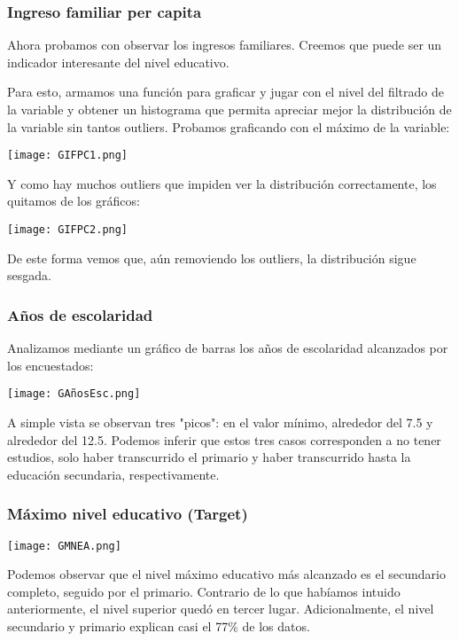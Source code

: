 \documentclass[a4paper]{article}
\begin{document}
        \subsubsection{Ingreso familiar per capita}
        
            Ahora probamos con observar los ingresos familiares. Creemos que puede ser un indicador interesante del nivel educativo.
        
            Para esto, armamos una función para graficar y jugar con el nivel del filtrado de la variable y obtener un histograma que permita apreciar mejor la distribución de la variable sin tantos outliers. Probamos graficando con el máximo de la variable:
        
            \texttt{[image: GIFPC1.png]}
        
            Y como hay muchos outliers que impiden ver la distribución correctamente, los quitamos de los gráficos:
        
            \texttt{[image: GIFPC2.png]}

            De este forma vemos que, aún removiendo los outliers, la distribución sigue sesgada.

        \newpage    

        \subsubsection{Años de escolaridad}
        
            Analizamos mediante un gráfico de barras los años de escolaridad alcanzados por los encuestados:
            
            \texttt{[image: GAñosEsc.png]}
            
            A simple vista se observan tres "picos": en el valor mínimo, alrededor del 7.5 y alrededor del 12.5. Podemos inferir que estos tres casos corresponden a no tener estudios, solo haber transcurrido el primario y haber transcurrido hasta la educación secundaria, respectivamente.
        
        \subsubsection{Máximo nivel educativo (Target)}
        
            \texttt{[image: GMNEA.png]}
        
            Podemos observar que el nivel máximo educativo más alcanzado es el secundario completo, seguido por el primario. Contrario de lo que habíamos intuido anteriormente, el nivel superior quedó en tercer lugar. Adicionalmente, el nivel secundario y primario explican casi el 77\% de los datos.
\end{document}
